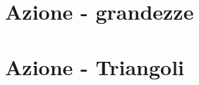 \documentclass[a4paper, 15pt]{article}
\begin{document}
\section{Azione - grandezze}
\newpage

\section{Azione - Triangoli}
\end{document}
